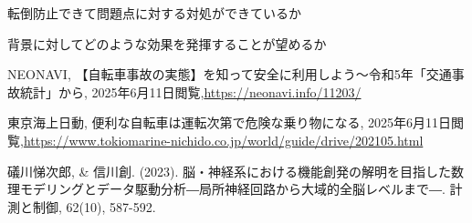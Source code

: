 \documentclass[uplatex,dvipdfmx]{jsarticle}
\begin{document}
転倒防止できて問題点に対する対処ができているか

背景に対してどのような効果を発揮することが望めるか




\begin{thebibliography}{9}

 NEONAVI, 【自転車事故の実態】を知って安全に利用しよう～令和5年「交通事故統計」から, 
2025年6月11日閲覧,\url{https://neonavi.info/11203/}

 東京海上日動, 便利な自転車は運転次第で危険な乗り物になる, 
2025年6月11日閲覧,\url{https://www.tokiomarine-nichido.co.jp/world/guide/drive/202105.html}

 礒川悌次郎, \& 信川創. (2023). 脳・神経系における機能創発の解明を目指した数理モデリングとデータ駆動分析―局所神経回路から大域的全脳レベルまで―. 計測と制御, 62(10), 587-592.

\end{thebibliography}
\end{document}
